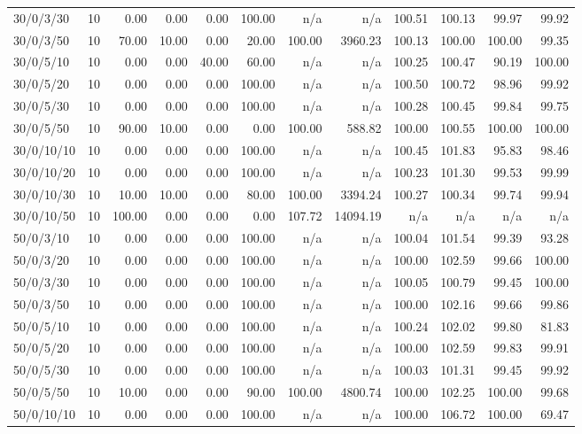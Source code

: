 \begin{table}[htbp]
{\begin{tabular}{lr*{10}{r}}
30/0/3/30 & 10 &  0.00 &  0.00 &  0.00 & 100.00 & n/a & n/a & 100.51 & 100.13 & 99.97 & 99.92 \\ 
30/0/3/50 & 10 & 70.00 & 10.00 &  0.00 & 20.00 & 100.00 & 3960.23 & 100.13 & 100.00 & 100.00 & 99.35 \\ 
30/0/5/10 & 10 &  0.00 &  0.00 & 40.00 & 60.00 & n/a & n/a & 100.25 & 100.47 & 90.19 & 100.00 \\ 
30/0/5/20 & 10 &  0.00 &  0.00 &  0.00 & 100.00 & n/a & n/a & 100.50 & 100.72 & 98.96 & 99.92 \\ 
30/0/5/30 & 10 &  0.00 &  0.00 &  0.00 & 100.00 & n/a & n/a & 100.28 & 100.45 & 99.84 & 99.75 \\ 
30/0/5/50 & 10 & 90.00 & 10.00 &  0.00 &  0.00 & 100.00 & 588.82 & 100.00 & 100.55 & 100.00 & 100.00 \\ 
30/0/10/10 & 10 &  0.00 &  0.00 &  0.00 & 100.00 & n/a & n/a & 100.45 & 101.83 & 95.83 & 98.46 \\ 
30/0/10/20 & 10 &  0.00 &  0.00 &  0.00 & 100.00 & n/a & n/a & 100.23 & 101.30 & 99.53 & 99.99 \\ 
30/0/10/30 & 10 & 10.00 & 10.00 &  0.00 & 80.00 & 100.00 & 3394.24 & 100.27 & 100.34 & 99.74 & 99.94 \\ 
30/0/10/50 & 10 & 100.00 &  0.00 &  0.00 &  0.00 & 107.72 & 14094.19 & n/a & n/a & n/a & n/a \\ 
50/0/3/10 & 10 &  0.00 &  0.00 &  0.00 & 100.00 & n/a & n/a & 100.04 & 101.54 & 99.39 & 93.28 \\ 
50/0/3/20 & 10 &  0.00 &  0.00 &  0.00 & 100.00 & n/a & n/a & 100.00 & 102.59 & 99.66 & 100.00 \\ 
50/0/3/30 & 10 &  0.00 &  0.00 &  0.00 & 100.00 & n/a & n/a & 100.05 & 100.79 & 99.45 & 100.00 \\ 
50/0/3/50 & 10 &  0.00 &  0.00 &  0.00 & 100.00 & n/a & n/a & 100.00 & 102.16 & 99.66 & 99.86 \\ 
50/0/5/10 & 10 &  0.00 &  0.00 &  0.00 & 100.00 & n/a & n/a & 100.24 & 102.02 & 99.80 & 81.83 \\ 
50/0/5/20 & 10 &  0.00 &  0.00 &  0.00 & 100.00 & n/a & n/a & 100.00 & 102.59 & 99.83 & 99.91 \\ 
50/0/5/30 & 10 &  0.00 &  0.00 &  0.00 & 100.00 & n/a & n/a & 100.03 & 101.31 & 99.45 & 99.92 \\ 
50/0/5/50 & 10 & 10.00 &  0.00 &  0.00 & 90.00 & 100.00 & 4800.74 & 100.00 & 102.25 & 100.00 & 99.68 \\ 
50/0/10/10 & 10 &  0.00 &  0.00 &  0.00 & 100.00 & n/a & n/a & 100.00 & 106.72 & 100.00 & 69.47 \\ 

\end{tabular}}
\end{table}
